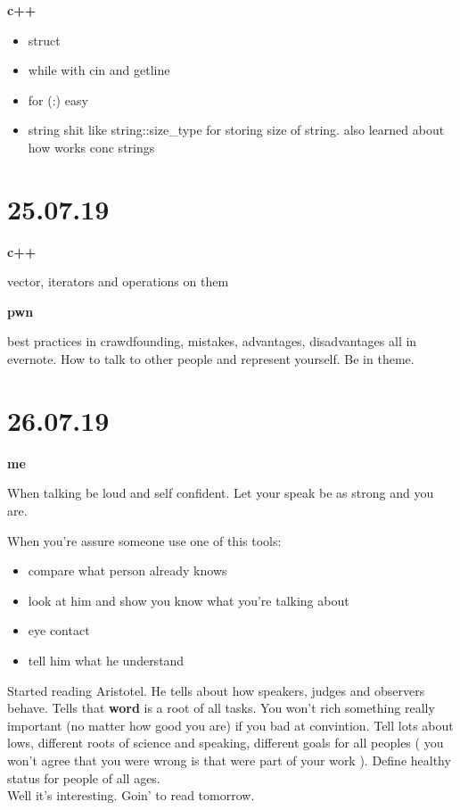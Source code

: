 \documentclass[12pt,a4paper,titlepage]{article}
\begin{document}
\begin{center}
    \large \textbf{c++}
\end{center}

\begin{itemize}
    \item struct
    \item while with cin and getline
    \item for (:) easy
    \item string shit like string::size\_type for storing size of string. also learned about how works conc strings
\end{itemize}

\newpage
\section{25.07.19}

\begin{center}
  \large \textbf{c++}
\end{center}

vector, iterators and operations on them

\begin{center}
  \large \textbf{pwn}
\end{center}

best practices in crawdfounding, mistakes, advantages, disadvantages all in evernote.
How to talk to other people and represent yourself. Be in theme.

\newpage
\section{26.07.19}

\begin{center}
  \large \textbf{me}
\end{center}

When talking be loud and self confident. Let your speak be as strong and you are.

When you're assure someone use one of this tools:
\begin{itemize}
  \item compare what person already knows
  \item look at him and show you know what you're talking about
  \item eye contact
  \item tell him what he understand
\end{itemize}

Started reading Aristotel. He tells about how speakers, judges and obser\-vers behave. Tells that \textbf{word} is a root of all tasks. You won't rich something really important (no matter how good you are) if you bad at convintion. Tell lots about lows, different roots of science and speaking, different goals for all peoples ( you won't agree that you were wrong is that were part of your work ). Define healthy status for people of all ages.\\
Well it's interesting. Goin' to read tomorrow.
\end{document}
